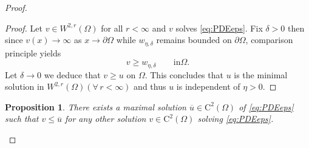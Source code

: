 \documentclass[11pt,reqno]{amsart}
\numberwithin{figure}{section}
\theoremstyle{plain}
\newtheorem{prop}[thm]{Proposition}
\theoremstyle{remark}
\numberwithin{equation}{section}
\begin{document}
\begin{proof}
\begin{proof}
    \noindent Let $v\in W^{2,r}(\Omega)$ for all $r<\infty$ and $v$ solves \eqref{eq:PDEeps}. Fix $\delta>0$ then since $v(x)\to \infty$ as $x\to \partial\Omega$ while $w_{\eta,\delta}$ remains bounded on $\partial \Omega$, comparison principle yields
    \begin{equation*}
        v\geq w_{\eta,\delta} \qquad\text{in}\Omega.
    \end{equation*}
    Let $\delta\to 0$ we deduce that $v\geq u$ on $\Omega$. This concludes that $u$ is the minimal solution in $W^{2,r}(\Omega)(\forall\,r<\infty)$ and thus $u$ is independent of $\eta>0$. 
\end{proof}



\begin{prop} There exists a maximal solution $\overline{u}\in \mathrm{C}^2(\Omega)$ of \eqref{eq:PDEeps} such that $v\leq \overline{u}$ for any other solution $v\in \mathrm{C}^2(\Omega)$ solving \eqref{eq:PDEeps}.
\end{prop}


\end{proof}
\end{document}

